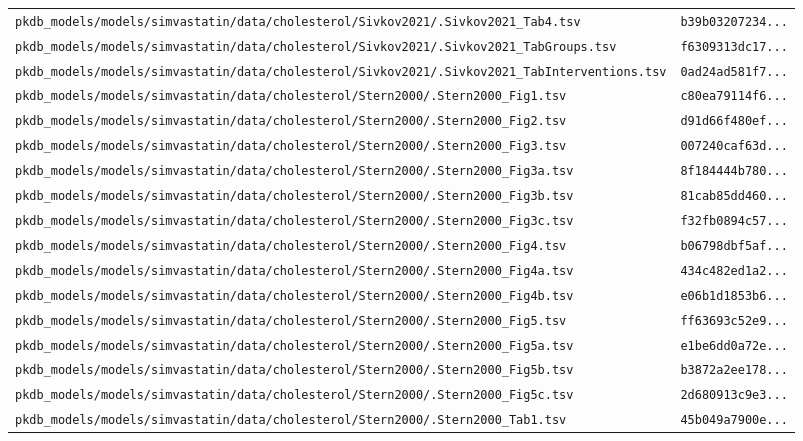 \begin{longtable}{ll}
\texttt{pkdb\_models/models/simvastatin/data/cholesterol/Sivkov2021/.Sivkov2021\_Tab4.tsv} & \texttt{b39b03207234...} \\
\texttt{pkdb\_models/models/simvastatin/data/cholesterol/Sivkov2021/.Sivkov2021\_TabGroups.tsv} & \texttt{f6309313dc17...} \\
\texttt{pkdb\_models/models/simvastatin/data/cholesterol/Sivkov2021/.Sivkov2021\_TabInterventions.tsv} & \texttt{0ad24ad581f7...} \\
\texttt{pkdb\_models/models/simvastatin/data/cholesterol/Stern2000/.Stern2000\_Fig1.tsv} & \texttt{c80ea79114f6...} \\
\texttt{pkdb\_models/models/simvastatin/data/cholesterol/Stern2000/.Stern2000\_Fig2.tsv} & \texttt{d91d66f480ef...} \\
\texttt{pkdb\_models/models/simvastatin/data/cholesterol/Stern2000/.Stern2000\_Fig3.tsv} & \texttt{007240caf63d...} \\
\texttt{pkdb\_models/models/simvastatin/data/cholesterol/Stern2000/.Stern2000\_Fig3a.tsv} & \texttt{8f184444b780...} \\
\texttt{pkdb\_models/models/simvastatin/data/cholesterol/Stern2000/.Stern2000\_Fig3b.tsv} & \texttt{81cab85dd460...} \\
\texttt{pkdb\_models/models/simvastatin/data/cholesterol/Stern2000/.Stern2000\_Fig3c.tsv} & \texttt{f32fb0894c57...} \\
\texttt{pkdb\_models/models/simvastatin/data/cholesterol/Stern2000/.Stern2000\_Fig4.tsv} & \texttt{b06798dbf5af...} \\
\texttt{pkdb\_models/models/simvastatin/data/cholesterol/Stern2000/.Stern2000\_Fig4a.tsv} & \texttt{434c482ed1a2...} \\
\texttt{pkdb\_models/models/simvastatin/data/cholesterol/Stern2000/.Stern2000\_Fig4b.tsv} & \texttt{e06b1d1853b6...} \\
\texttt{pkdb\_models/models/simvastatin/data/cholesterol/Stern2000/.Stern2000\_Fig5.tsv} & \texttt{ff63693c52e9...} \\
\texttt{pkdb\_models/models/simvastatin/data/cholesterol/Stern2000/.Stern2000\_Fig5a.tsv} & \texttt{e1be6dd0a72e...} \\
\texttt{pkdb\_models/models/simvastatin/data/cholesterol/Stern2000/.Stern2000\_Fig5b.tsv} & \texttt{b3872a2ee178...} \\
\texttt{pkdb\_models/models/simvastatin/data/cholesterol/Stern2000/.Stern2000\_Fig5c.tsv} & \texttt{2d680913c9e3...} \\
\texttt{pkdb\_models/models/simvastatin/data/cholesterol/Stern2000/.Stern2000\_Tab1.tsv} & \texttt{45b049a7900e...} \\

\end{longtable}
